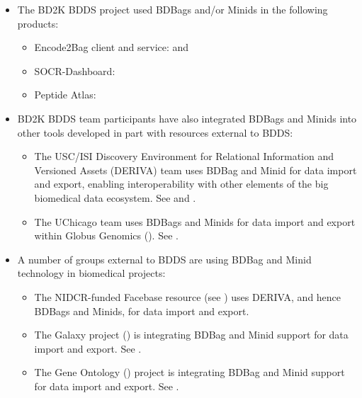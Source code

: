 \documentclass[11pt]{article}
\begin{document}
\begin{itemize}
\item
The BD2K BDDS project used BDBags and/or Minids in the following products: %
\begin{itemize}
\item
Encode2Bag client and service:  and 

\item
SOCR-Dashboard: 

\item
Peptide Atlas: 
\end{itemize}

\item
BD2K BDDS team participants have also integrated BDBags and Minids into other tools 
developed in part with resources external to BDDS:
\begin{itemize}
\item
The USC/ISI Discovery Environment for Relational Information and Versioned Assets (DERIVA) 
team uses BDBag and Minid for data import and export, enabling interoperability with other elements of the big biomedical data ecosystem. See  and .
\item
The UChicago team uses BDBags and Minids for data import and export within Globus Genomics 
(). See .
\end{itemize}

\item
A number of groups external to BDDS are using BDBag and Minid technology in biomedical projects:
\begin{itemize}
\item
The NIDCR-funded Facebase resource (see ) uses DERIVA, and hence BDBags and Minids, for data import and export.

\item
The Galaxy project () is integrating BDBag and Minid support for data import and export. 
See .

\item
The Gene Ontology () project is integrating BDBag and Minid support for data import and export.
See .


\end{itemize}
\end{itemize}
\end{document}
